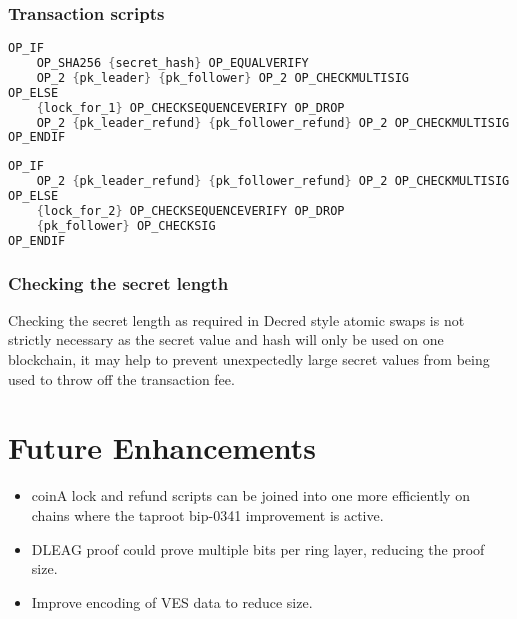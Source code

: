 \documentclass[a4paper]{article}
\begin{document}
\subsubsection{Transaction scripts}

\begin{lstlisting}[language=C++, caption={\noindent Lock tx output script}]
OP_IF
    OP_SHA256 {secret_hash} OP_EQUALVERIFY
    OP_2 {pk_leader} {pk_follower} OP_2 OP_CHECKMULTISIG
OP_ELSE
    {lock_for_1} OP_CHECKSEQUENCEVERIFY OP_DROP
    OP_2 {pk_leader_refund} {pk_follower_refund} OP_2 OP_CHECKMULTISIG
OP_ENDIF
\end{lstlisting}

\begin{lstlisting}[language=C++, caption={\noindent Lock refund tx output script}]
OP_IF
    OP_2 {pk_leader_refund} {pk_follower_refund} OP_2 OP_CHECKMULTISIG
OP_ELSE
    {lock_for_2} OP_CHECKSEQUENCEVERIFY OP_DROP
    {pk_follower} OP_CHECKSIG
OP_ENDIF
\end{lstlisting}

\subsubsection{Checking the secret length}
Checking the secret length as required in Decred style atomic swaps
\cite{advisory1} is not strictly necessary as the secret value and hash
will only be used on one blockchain, it may help to prevent unexpectedly
large secret values from being used to throw off the transaction fee.

\section{Future Enhancements}
\begin{itemize}
    \item coinA lock and refund scripts can be joined into one more efficiently on
          chains where the taproot bip-0341\cite{bip-0341} improvement is active.
    \item DLEAG proof could prove multiple bits per ring layer, reducing the proof size.
    \item Improve encoding of VES data to reduce size.
\end{itemize}

\clearpage

\printbibliography
\end{document}
